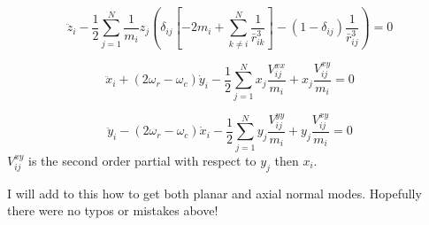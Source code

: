 \documentclass[12pt]{article}
\begin{document}
\begin{equation}
\ddot{z}_i - \frac{1}{2} \sum^N_{j=1}  \frac{1}{m_i} z_j \left( \delta_{i j} \left[ -2 m_{i}+\sum^N_{k \neq i}\frac{1}{\bar{r}^3_{i k}}\right]
-  \left(1- \delta_{i j} \right) \frac{1}{\bar{r}^3_{i j}} \right) = 0
\end{equation}

\begin{equation}
\ddot{x}_i +\left(2\omega_r - \omega_c \right) \dot{y}_i - \frac{1}{2} \sum^N_{j=1} x_j \frac{V^{xx}_{ij}}{m_i} + x_j \frac{V^{xy}_{ij}}{m_i} = 0
\end{equation}

\begin{equation}
\ddot{y}_i -\left(2\omega_r - \omega_c \right) \dot{x}_i - \frac{1}{2} \sum^N_{j=1} y_j \frac{V^{yy}_{ij}}{m_i} + y_j \frac{V^{xy}_{ij}}{m_i} = 0
\end{equation}
$V_{ij}^{xy}$ is the second order partial with respect to $y_j$ then $x_i$. 

I will add to this how to get both planar and axial normal modes. Hopefully there were no typos or mistakes above!
\end{document}
